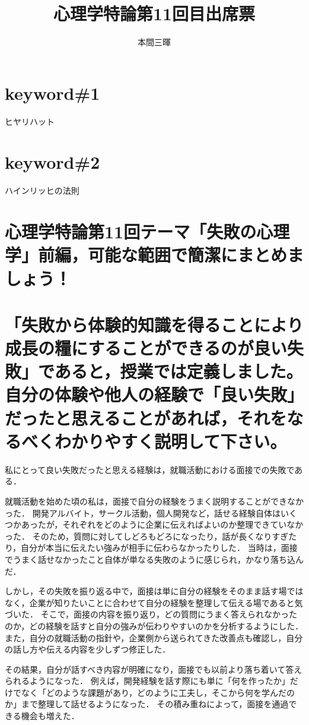\documentclass[titlepage,a4paper]{jsarticle}
\title{心理学特論第11回目出席票}
\author{本間三暉}
\begin{document}
\maketitle
\section*{keyword\#1}
ヒヤリハット
\section*{keyword\#2}
ハインリッヒの法則
\section*{心理学特論第11回テーマ「失敗の心理学」前編，可能な範囲で簡潔にまとめましょう！}
\section{「失敗から体験的知識を得ることにより成長の糧にすることができるのが良い失敗」であると，授業では定義しました。
自分の体験や他人の経験で「良い失敗」だったと思えることがあれば，それをなるべくわかりやすく説明して下さい。}
私にとって良い失敗だったと思える経験は，就職活動における面接での失敗である．

就職活動を始めた頃の私は，面接で自分の経験をうまく説明することができなかった．
開発アルバイト，サークル活動，個人開発など，話せる経験自体はいくつかあったが，それぞれをどのように企業に伝えればよいのか整理できていなかった．
そのため，質問に対してしどろもどろになったり，話が長くなりすぎたり，自分が本当に伝えたい強みが相手に伝わらなかったりした．
当時は，面接でうまく話せなかったこと自体が単なる失敗のように感じられ，かなり落ち込んだ．

しかし，その失敗を振り返る中で，面接は単に自分の経験をそのまま話す場ではなく，企業が知りたいことに合わせて自分の経験を整理して伝える場であると気づいた．
そこで，面接の内容を振り返り，どの質問にうまく答えられなかったのか，どの経験を話すと自分の強みが伝わりやすいのかを分析するようにした．
また，自分の就職活動の指針や，企業側から送られてきた改善点も確認し，自分の話し方や伝える内容を少しずつ修正した．

その結果，自分が話すべき内容が明確になり，面接でも以前より落ち着いて答えられるようになった．
例えば，開発経験を話す際にも単に「何を作ったか」だけでなく「どのような課題があり，どのように工夫し，そこから何を学んだのか」まで整理して話せるようになった．
その積み重ねによって，面接を通過できる機会も増えた．
\end{document}
